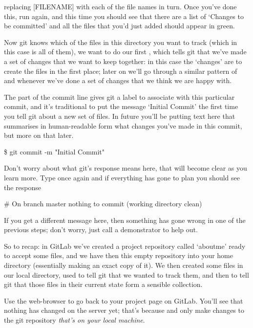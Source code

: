 
replacing [FILENAME] with each of the file names in turn. Once you've done this, run  again, and this time you should see that there are a list of `Changes to be committed' and all the files that you'd just added should appear in green. 

Now git knows which of the files in this directory you want to track (which in this case is all of them), we want to do our first , which tells git that we've made a set of changes that we want to keep together: in this case the `changes' are to create the files in the first place; later on we'll go through a similar pattern of  and  whenever we've done a set of changes that we think we are happy with. 

The  part of the commit line gives git a label to associate with this particular commit, and it's traditional to put the message `Initial Commit' the first time you tell git about a new set of files. In future you'll be putting text here that summarises in human-readable form what changes you've made in this commit, but more on that later.

\begin{ttoutenv}
\$ git commit -m "Initial Commit"
\end{ttoutenv}

Don't worry about what git's response means here, that will become clear as you learn more. Type  once again and if everything has gone to plan you should see the response

\begin{ttoutenv}
# On branch master
nothing to commit (working directory clean)
\end{ttoutenv}

If you get a different message here, then something has gone wrong in one of the previous steps; don't worry, just call a demonstrator to help out. 

So to recap: in GitLab we've created a project repository called `aboutme' ready to accept some files, and we have then  this empty repository into your home directory (essentially making an exact copy of it). We then created some files in our local directory, used  to tell git that we wanted to track them, and then  to tell git that those files in their current state form a sensible collection. 

Use the web-browser to go back to your  project page on GitLab. You'll see that nothing has changed on the server yet; that's because  and  only make changes to the git repository \emph{that's on your local machine}.

